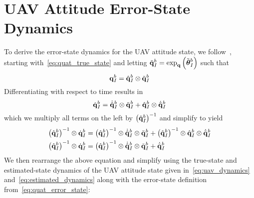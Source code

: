 \section{UAV Attitude Error-State Dynamics}
To derive the error-state dynamics for the UAV attitude state, we
follow~\cite{koch2017relative}, starting
with~\eqref{eq:quat_true_state} and letting $\tilde{\boldsymbol{\mathrm{q}}}_I^b = \exp_{\boldsymbol{\mathrm{q}}} \left(
  \tilde{\boldsymbol{\mathrm{\theta}}}_I^b \right)$ such that
\begin{equation}
  \boldsymbol{\mathrm{q}}_I^b  = \hat{\boldsymbol{\mathrm{q}}}_I^b \otimes \tilde{\boldsymbol{\mathrm{q}}}_I^b
\end{equation}
Differentiating with respect to time results in
\begin{equation}
  \dot{\boldsymbol{\mathrm{q}}}_I^b  = \dot{\hat{\boldsymbol{\mathrm{q}}}}_I^b \otimes \tilde{\boldsymbol{\mathrm{q}}}_I^b + 
  \hat{\boldsymbol{\mathrm{q}}}_I^b \otimes \dot{\tilde{\boldsymbol{\mathrm{q}}}}_I^b
\end{equation}
which we multiply all terms on the left by $\left( \hat{\boldsymbol{\mathrm{q}}}_I^b \right)^{-1}$
and simplify to yield
\begin{align}
  \left( \hat{\boldsymbol{\mathrm{q}}}_I^b \right)^{-1} \otimes \dot{\boldsymbol{\mathrm{q}}}_I^b  &= \left( \hat{\boldsymbol{\mathrm{q}}}_I^b
  \right)^{-1} \otimes \dot{\hat{\boldsymbol{\mathrm{q}}}}_I^b \otimes \tilde{\boldsymbol{\mathrm{q}}}_I^b + 
  \left( \hat{\boldsymbol{\mathrm{q}}}_I^b \right)^{-1} \otimes \hat{\boldsymbol{\mathrm{q}}}_I^b \otimes \dot{\tilde{\boldsymbol{\mathrm{q}}}}_I^b
  \\
  \left( \hat{\boldsymbol{\mathrm{q}}}_I^b \right)^{-1} \otimes \dot{\boldsymbol{\mathrm{q}}}_I^b  &= \left( \hat{\boldsymbol{\mathrm{q}}}_I^b
  \right)^{-1} \otimes \dot{\hat{\boldsymbol{\mathrm{q}}}}_I^b \otimes \tilde{\boldsymbol{\mathrm{q}}}_I^b + 
  \dot{\tilde{\boldsymbol{\mathrm{q}}}}_I^b
\end{align}
We then rearrange the above equation and simplify using the true-state and
estimated-state dynamics of the UAV attitude state given
in~\eqref{eq:uav_dynamics} and~\eqref{eq:estimated_dynamics} along with the
error-state definition from~\eqref{eq:quat_error_state}:

